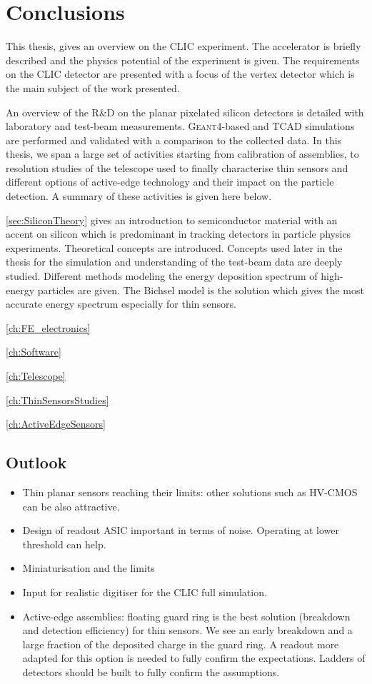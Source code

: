 \chapter{Conclusions}
\label{ch:conclusions}

This thesis, gives an overview on the CLIC experiment. The accelerator
is briefly described and the physics potential of the experiment is
given. The requirements on the CLIC detector are presented with a
focus of the vertex detector which is the main subject of the work
presented.

An overview of the R\&D on the planar pixelated silicon detectors is
detailed with laboratory and test-beam
measurements. \textsc{Geant4}-based and TCAD simulations are performed
and validated with a comparison to the collected data. In this thesis,
we span a large set of activities starting from calibration of
assemblies, to resolution studies of the telescope used to finally
characterise thin sensors and different options of active-edge
technology and their impact on the particle detection. A summary of
these activities is given here below.

\cref{sec:SiliconTheory} gives an introduction to semiconductor
material with an accent on silicon which is predominant in tracking
detectors in particle physics experiments. Theoretical concepts are
introduced. Concepts used later in the thesis for the simulation and
understanding of the test-beam data are deeply studied. Different
methods modeling the energy deposition spectrum of high-energy
particles are given. The Bichsel model is the solution which gives the
most accurate energy spectrum especially for thin sensors.

\cref{ch:FE_electronics}

\cref{ch:Software}

\cref{ch:Telescope}

\cref{ch:ThinSensorsStudies}

\cref{ch:ActiveEdgeSensors}

\section{Outlook}
\begin{itemize}
\item Thin planar sensors reaching their limits: other solutions such
  as HV-CMOS can be also attractive.
\item Design of readout ASIC important in terms of noise. Operating at
  lower threshold can help.
\item Miniaturisation and the limits
\item Input for realistic digitiser for the CLIC full simulation. 
\item Active-edge assemblies: floating guard ring is the best solution
  (breakdown and detection efficiency) for thin sensors. We see an
  early breakdown and a large fraction of the deposited charge in the
  guard ring. A readout more adapted for this option is needed to
  fully confirm the expectations. Ladders of detectors should be built
  to fully confirm the assumptions.
\end{itemize}

